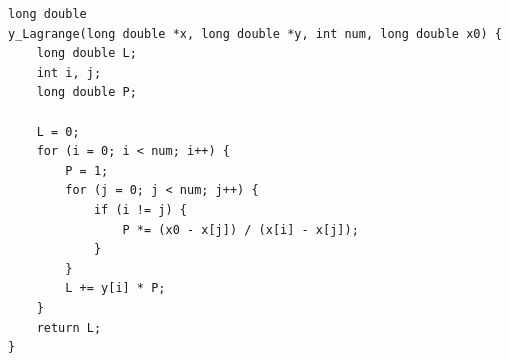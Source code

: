 \documentclass[a4paper, 14pt]{extreport}
\begin{document}
\vspace{-\medskipamount}
\vspace{-2\baselineskip}
\vspace{10pt}
\begin{verbatim}
long double
y_Lagrange(long double *x, long double *y, int num, long double x0) {
    long double L;
    int i, j;
    long double P;

    L = 0;
    for (i = 0; i < num; i++) {
        P = 1;
        for (j = 0; j < num; j++) {
            if (i != j) {
                P *= (x0 - x[j]) / (x[i] - x[j]);              
            }
        }
        L += y[i] * P;
    }
    return L;
}
\end{verbatim}
\\
\vspace{-\medskipamount}
\vspace{-2\baselineskip}
\vspace{10pt}
\end{document}
